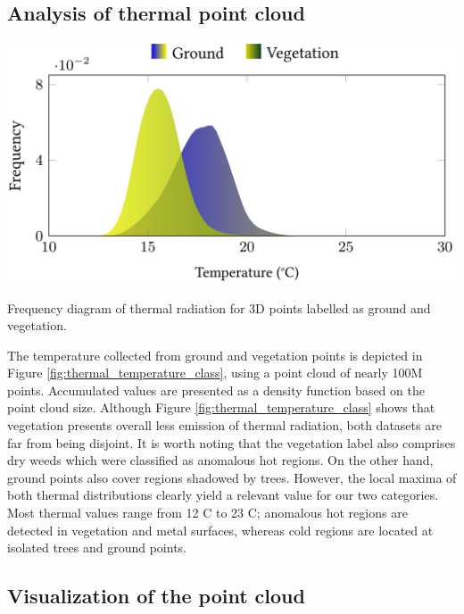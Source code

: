 \newpage
\subsection{Analysis of thermal point cloud}

\begin{marginfigure}[1cm]
	\centering
	\includegraphics{figs/thermal_projection/temperature_class.png}
	\caption{Frequency diagram of thermal radiation for 3D points labelled as ground and vegetation.}
	\label{fig:thermal_temperature_class}
\end{marginfigure}
The temperature collected from ground and vegetation points is depicted in Figure \ref{fig:thermal_temperature_class}, using a point cloud of nearly 100M points. Accumulated values are presented as a density function based on the point cloud size. Although Figure \ref{fig:thermal_temperature_class} shows that vegetation presents overall less emission of thermal radiation, both datasets are far from being disjoint. It is worth noting that the vegetation label also comprises dry weeds which were classified as anomalous hot regions. On the other hand, ground points also cover regions shadowed by trees. However, the local maxima of both thermal distributions clearly yield a relevant value for our two categories. Most thermal values range from 12 \textdegree C to 23 \textdegree C; anomalous hot regions are detected in vegetation and metal surfaces, whereas cold regions are located at isolated trees and ground points.

\subsection{Visualization of the point cloud}

